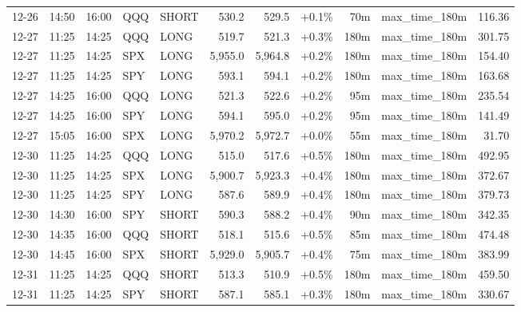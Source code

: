 \documentclass[11pt,a4paper,twoside]{article}
\begin{document}
\begin{center}
\begin{longtable}{>{\color{txtmain}}l l l l l r r r r >{\color{txtmain}}l r}
12-26 & 14:50 & 16:00 & QQQ & SHORT & 530.2 & 529.5 & \textcolor{wingreen}{+0.1\%} & 70m & max\_time\_180m & \textcolor{wingreen}{116.36} \\
12-27 & 11:25 & 14:25 & QQQ & LONG & 519.7 & 521.3 & \textcolor{wingreen}{+0.3\%} & 180m & max\_time\_180m & \textcolor{wingreen}{301.75} \\
12-27 & 11:25 & 14:25 & SPX & LONG & 5,955.0 & 5,964.8 & \textcolor{wingreen}{+0.2\%} & 180m & max\_time\_180m & \textcolor{wingreen}{154.40} \\
12-27 & 11:25 & 14:25 & SPY & LONG & 593.1 & 594.1 & \textcolor{wingreen}{+0.2\%} & 180m & max\_time\_180m & \textcolor{wingreen}{163.68} \\
12-27 & 14:25 & 16:00 & QQQ & LONG & 521.3 & 522.6 & \textcolor{wingreen}{+0.2\%} & 95m & max\_time\_180m & \textcolor{wingreen}{235.54} \\
12-27 & 14:25 & 16:00 & SPY & LONG & 594.1 & 595.0 & \textcolor{wingreen}{+0.2\%} & 95m & max\_time\_180m & \textcolor{wingreen}{141.49} \\
12-27 & 15:05 & 16:00 & SPX & LONG & 5,970.2 & 5,972.7 & \textcolor{wingreen}{+0.0\%} & 55m & max\_time\_180m & \textcolor{wingreen}{31.70} \\
12-30 & 11:25 & 14:25 & QQQ & LONG & 515.0 & 517.6 & \textcolor{wingreen}{+0.5\%} & 180m & max\_time\_180m & \textcolor{wingreen}{492.95} \\
12-30 & 11:25 & 14:25 & SPX & LONG & 5,900.7 & 5,923.3 & \textcolor{wingreen}{+0.4\%} & 180m & max\_time\_180m & \textcolor{wingreen}{372.67} \\
12-30 & 11:25 & 14:25 & SPY & LONG & 587.6 & 589.9 & \textcolor{wingreen}{+0.4\%} & 180m & max\_time\_180m & \textcolor{wingreen}{379.73} \\
12-30 & 14:30 & 16:00 & SPY & SHORT & 590.3 & 588.2 & \textcolor{wingreen}{+0.4\%} & 90m & max\_time\_180m & \textcolor{wingreen}{342.35} \\
12-30 & 14:35 & 16:00 & QQQ & SHORT & 518.1 & 515.6 & \textcolor{wingreen}{+0.5\%} & 85m & max\_time\_180m & \textcolor{wingreen}{474.48} \\
12-30 & 14:45 & 16:00 & SPX & SHORT & 5,929.0 & 5,905.7 & \textcolor{wingreen}{+0.4\%} & 75m & max\_time\_180m & \textcolor{wingreen}{383.99} \\
12-31 & 11:25 & 14:25 & QQQ & SHORT & 513.3 & 510.9 & \textcolor{wingreen}{+0.5\%} & 180m & max\_time\_180m & \textcolor{wingreen}{459.50} \\
12-31 & 11:25 & 14:25 & SPY & SHORT & 587.1 & 585.1 & \textcolor{wingreen}{+0.3\%} & 180m & max\_time\_180m & \textcolor{wingreen}{330.67} \\

\end{longtable}
\end{center}
\end{document}
